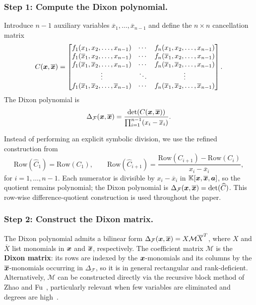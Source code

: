\subsubsection{Step 1: Compute the Dixon polynomial.}\label{dixon_step1}
Introduce $n-1$ auxiliary variables $\overline{x}_1, \ldots, \overline{x}_{n-1}$ and define the $n \times n$ cancellation matrix
\begin{equation}
	C({\boldsymbol{x}}, \overline{{\boldsymbol{x}}}) = 
	\begin{bmatrix}
		f_1(x_1, x_2, \dots, x_{n-1}) & \cdots & f_n(x_1, x_2, \dots, x_{n-1}) \\
		f_1(\overline{x}_1, x_2, \dots, x_{n-1}) & \cdots & f_n(\overline{x}_1, x_2, \dots, x_{n-1}) \\
		f_1(\overline{x}_1, \overline{x}_2, \dots, x_{n-1}) & \cdots & f_n(\overline{x}_1, \overline{x}_2, \dots, x_{n-1}) \\
		\vdots & \ddots & \vdots \\
		f_1(\overline{x}_1, \overline{x}_2, \dots, \overline{x}_{n-1}) & \cdots & f_n(\overline{x}_1, \overline{x}_2, \dots, \overline{x}_{n-1})
	\end{bmatrix}.
	\label{eq:CancellationMatrix}
\end{equation}
The Dixon polynomial is
\begin{equation}
	\Delta_{\mathcal F}({\boldsymbol{x}},\overline{{\boldsymbol{x}}}) = \frac{\det(C({\boldsymbol{x}}, \overline{{\boldsymbol{x}}}))}{\prod_{i=1}^{n-1} (x_i - \overline{x}_i)}.
	\label{eq:Dixon_polynomial}
\end{equation}

Instead of performing an explicit symbolic division, we use the refined construction from~\cite{DBLP:conf/casc/JinaduM22}
\begin{equation}
	\mathrm{Row}(\widehat{C}_1) = \mathrm{Row}(C_1), \qquad
	\mathrm{Row}(\widehat{C}_{i+1}) = \frac{\mathrm{Row}(C_{i+1}) - \mathrm{Row}(C_i)}{x_i - \overline{x}_i},
	\label{eq:Dixon_polynomial_improve}
\end{equation}
for $i=1,\ldots,n-1$. Each numerator is divisible by $x_i-\overline{x}_i$ in $\mathbb{K}[{\boldsymbol{x}},\overline{{\boldsymbol{x}}},{\boldsymbol{a}}]$, so the quotient remains polynomial; the Dixon polynomial is $\Delta_{\mathcal F}({\boldsymbol{x}},\overline{{\boldsymbol{x}}})=\det(\widehat{C})$. This row-wise difference-quotient construction is used throughout the paper.

\subsubsection{Step 2: Construct the Dixon matrix.}\label{dixon_step2}
The Dixon polynomial admits a bilinear form $\Delta_{\mathcal F}({\boldsymbol{x}},\overline{{\boldsymbol{x}}}) = X \mathcal{M} \overline{X}^{T}$, where $X$ and $\overline{X}$ list monomials in ${\boldsymbol{x}}$ and $\overline{{\boldsymbol{x}}}$, respectively. The coefficient matrix $\mathcal{M}$ is the \textbf{Dixon matrix}: its rows are indexed by the ${\boldsymbol{x}}$-monomials and its columns by the $\overline{{\boldsymbol{x}}}$-monomials occurring in $\Delta_{\mathcal F}$, so it is in general rectangular and rank-deficient. Alternatively, $\mathcal{M}$ can be constructed directly via the recursive block method of Zhao and Fu~\cite{Zhao2005extfast}, particularly relevant when few variables are eliminated and degrees are high~\cite{DBLP:journals/ijcm/QinWTJ17}.

